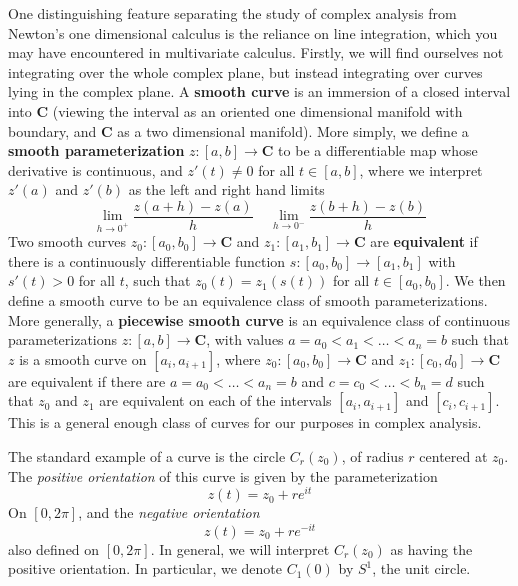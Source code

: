 One distinguishing feature separating the study of complex analysis from Newton's one dimensional calculus is the reliance on line integration, which you may have encountered in multivariate calculus. Firstly, we will find ourselves not integrating over the whole complex plane, but instead integrating over curves lying in the complex plane. A {\bf smooth curve} is an immersion of a closed interval into $\mathbf{C}$ (viewing the interval as an oriented one dimensional manifold with boundary, and $\mathbf{C}$ as a two dimensional manifold). More simply, we define a {\bf smooth parameterization} $z: [a,b] \to \mathbf{C}$ to be a differentiable map whose derivative is continuous, and $z'(t) \neq 0$ for all $t \in [a,b]$, where we interpret $z'(a)$ and $z'(b)$ as the left and right hand limits
%
\[ \lim_{h \to 0^+} \frac{z(a + h) - z(a)}{h}\ \ \ \ \ \lim_{h \to 0^-} \frac{z(b + h) - z(b)}{h} \]
%
Two smooth curves $z_0: [a_0,b_0] \to \mathbf{C}$ and $z_1: [a_1,b_1] \to \mathbf{C}$ are {\bf equivalent} if there is a continuously differentiable function $s: [a_0,b_0] \to [a_1,b_1]$ with $s'(t) > 0$ for all $t$, such that $z_0(t) = z_1(s(t))$ for all $t \in [a_0,b_0]$. We then define a smooth curve to be an equivalence class of smooth parameterizations. More generally, a {\bf piecewise smooth curve} is an equivalence class of continuous parameterizations $z: [a,b] \to \mathbf{C}$, with values $a = a_0 < a_1 < \dots < a_n = b$ such that $z$ is a smooth curve on $[a_i,a_{i+1}]$, where $z_0: [a_0,b_0] \to \mathbf{C}$ and $z_1:[c_0,d_0] \to \mathbf{C}$ are equivalent if there are $a = a_0 < \dots < a_n = b$ and $c = c_0 < \dots < b_n = d$ such that $z_0$ and $z_1$ are equivalent on each of the intervals $[a_i,a_{i+1}]$ and $[c_i,c_{i+1}]$. This is a general enough class of curves for our purposes in complex analysis.

\begin{example}
    The standard example of a curve is the circle $C_r(z_0)$, of radius $r$ centered at $z_0$. The {\it positive orientation} of this curve is given by the parameterization
    \[ z(t) = z_0 + re^{it} \]
    On $[0,2\pi]$, and the {\it negative orientation}
    \[ z(t) = z_0 + re^{-it} \]
    also defined on $[0,2\pi]$. In general, we will interpret $C_r(z_0)$ as having the positive orientation. In particular, we denote $C_1(0)$ by $S^1$, the unit circle.
\end{example}

